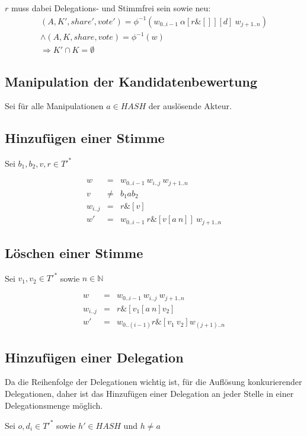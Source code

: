 \documentclass[a4paper,12pt]{report}
\begin{document}
$r$ muss dabei Delegations- und Stimmfrei sein sowie neu:
\begin{eqnarray}
(A,K',share',vote') = \phi^{-1}(w_{0..i-1}\ \alpha[r\& []][d]\ w_{j+1..n}) \\\land (A,K,share,vote) = \phi^{-1}(w) \\\Rightarrow K'\cap K = \emptyset
\end{eqnarray}


\subsection*{Manipulation der Kandidatenbewertung}
Sei für alle Manipulationen $a\in HASH$ der auslösende Akteur.

\subsection*{Hinzufügen einer Stimme}
Sei $b_1,b_2,v,r \in T'^*$

\begin{eqnarray}
  w &=& w_{0 .. i-1}\ w_{i..j}\ w_{j+1 .. n} \\
  v &\neq& b_1 a b_2 \\
  w_{i..j} &=& r\& [v] \\
  w' &=& w_{0 .. i-1}\ r \& [v[a\ n]]\ w_{j+1 .. n}
\end{eqnarray}

\subsection*{Löschen einer Stimme}

Sei $v_1, v_2 \in T'^*$ sowie $n\in\mathbb{N}$

\begin{eqnarray}
  w &=& w_{0 .. i-1}\ w_{i..j}\ w_{j+1 .. n} \\
  w_{i..j}&=& r\& [v_1 [a\ n] v_2] \\
  w' &=& w_{0..(i-1)} r\& [v_1\ v_2] w_{(j+1)..n}
\end{eqnarray}


\subsection*{Hinzufügen einer Delegation}
Da die Reihenfolge der Delegationen wichtig ist, für die Auflösung konkurierender Delegationen, daher ist das Hinzufügen einer Delegation an jeder Stelle in einer Delegationsmenge möglich.

Sei $o,d_i \in T'^*$ sowie $h'\in HASH$ und $h\neq a$
\end{document}
